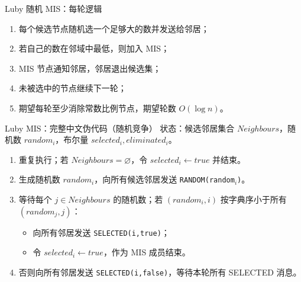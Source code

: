\documentclass[UTF8,fontset=none,aspectratio=169,10pt]{beamer}
\begin{document}
{\begin{frame}{Luby 随机 MIS：每轮逻辑}
\begin{enumerate}
  \item 每个候选节点随机选一个足够大的数并发送给邻居；
  \item 若自己的数在邻域中最低，则加入 MIS；
  \item MIS 节点通知邻居，邻居退出候选集；
  \item 未被选中的节点继续下一轮；
  \item 期望每轮至少消除常数比例节点，期望轮数 $O(\log n)$。
\end{enumerate}
\vfill
{}
\end{frame}

\begin{frame}{Luby MIS：完整中文伪代码（随机竞争）}
\scriptsize
状态：候选邻居集合 $Neighbours$，随机数 $random_i$，布尔量 $selected_i,eliminated_i$。
\begin{enumerate}
  \item 重复执行；若 $Neighbours=\varnothing$，令 $selected_i\leftarrow true$ 并结束。
  \item 生成随机数 $random_i$，向所有候选邻居发送 \texttt{RANDOM(random$_i$)}。
  \item 等待每个 $j\in Neighbours$ 的随机数；若 $(random_i,i)$ 按字典序小于所有 $(random_j,j)$：
  \begin{itemize}\scriptsize
    \item 向所有邻居发送 \texttt{SELECTED(i,true)}；
    \item 令 $selected_i\leftarrow true$，作为 MIS 成员结束。
  \end{itemize}
  \item 否则向所有邻居发送 \texttt{SELECTED(i,false)}，等待本轮所有 SELECTED 消息。
\end{enumerate}
\normalsize
{}
\end{frame}

}
\end{document}
